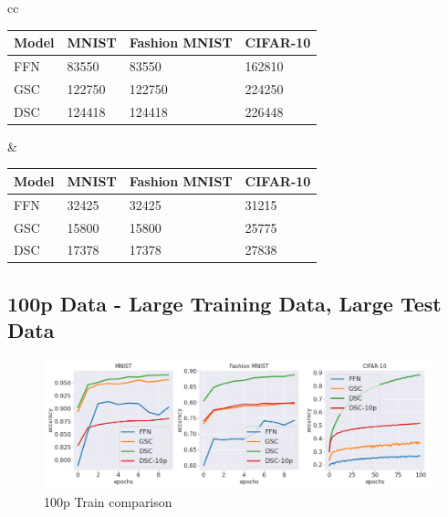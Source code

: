 \documentclass{article}
\begin{document}
\begin{tabular}{cc}
    \begin{minipage}{.5\linewidth}
\centering
\begin{tabular}{@{}llll@{}}
\toprule
\textbf{Model} & \textbf{MNIST} & \textbf{Fashion MNIST} & \textbf{CIFAR-10} \\ \midrule
FFN            & 83550          & 83550                  & 162810            \\
GSC            & 122750         & 122750                 & 224250            \\
DSC            & 124418         & 124418                 & 226448            \\ \bottomrule
\end{tabular}
\label{tab:my-table}
    \end{minipage} &
    \begin{minipage}{.5\linewidth}
    \centering
    \begin{tabular}{@{}llll@{}}
\toprule
\textbf{Model} & \textbf{MNIST} & \textbf{Fashion MNIST} & \textbf{CIFAR-10} \\ \midrule
FFN            & 32425          & 32425                  & 31215             \\
GSC            & 15800          & 15800                  & 25775             \\
DSC            & 17378          & 17378                  & 27838             \\ \bottomrule
\end{tabular}
\label{tab:my-table}
    \end{minipage} 
\end{tabular}


\subsection{100p Data - Large Training Data, Large Test Data}

\begin{figure}[h!]
\centering
\includegraphics[scale=0.4]{paper/100p_runs.png}
\caption{100p Train comparison}
\label{fig:infotransfer}
\end{figure}
\end{document}

